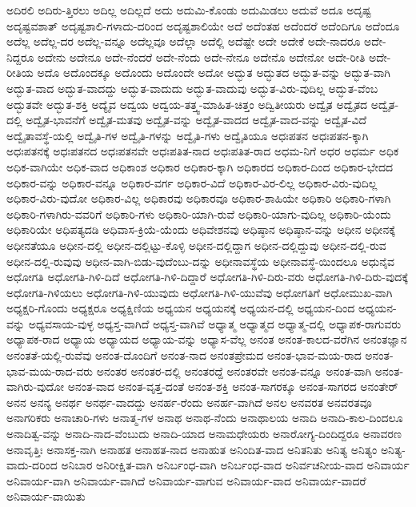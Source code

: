 {ಅದಿರಲಿ
ಅದಿರು-ತ್ತಿರಲು
ಅದಿಲ್ಲ
ಅದಿಲ್ಲದೆ
ಅದು
ಅದುಮಿ-ಕೊಂಡು
ಅದುಮಿಡಲು
ಅದುವೆ
ಅದೂ
ಅದೃಷ್ಟ
ಅದೃಷ್ಟವಶಾತ್
ಅದೃಷ್ಟಶಾಲಿ-ಗಳಾದು-ದರಿಂದ
ಅದೃಷ್ಟಶಾಲಿಯೇ
ಅದೆ
ಅದೆಂತಹ
ಅದೆಂದರೆ
ಅದೆಂದಿಗೂ
ಅದೆಂದೂ
ಅದೆಲ್ಲ
ಅದೆಲ್ಲ-ದರ
ಅದೆಲ್ಲ-ವನ್ನೂ
ಅದೆಲ್ಲವೂ
ಅದೆಲ್ಲಾ
ಅದೆಲ್ಲಿ
ಅದೆಷ್ಟೇ
ಅದೇ
ಅದೇಕೆ
ಅದೇ-ನಾದರೂ
ಅದೇ-ನಿದ್ದರೂ
ಅದೇನು
ಅದೇನೂ
ಅದೇ-ನೆಂದರೆ
ಅದೇ-ನೆಂದು
ಅದೇ-ನೇನೂ
ಅದೇನೊ
ಅದೇನೋ
ಅದೇ-ರೀತಿ
ಅದೇ-ರೀತಿಯ
ಅದೊ
ಅದೊಂದಕ್ಕೂ
ಅದೊಂದು
ಅದೊಂದೇ
ಅದೋ
ಅದ್ಭುತ
ಅದ್ಭುತದ
ಅದ್ಭುತ-ವನ್ನು
ಅದ್ಭುತ-ವಾಗಿ
ಅದ್ಭುತ-ವಾದ
ಅದ್ಭುತ-ವಾದದ್ದು
ಅದ್ಭುತ-ವಾದುದು
ಅದ್ಭುತ-ವಾದುವು
ಅದ್ಭುತ-ವಿರು-ವುದಿಲ್ಲ
ಅದ್ಭುತ-ವೆಂಬ
ಅದ್ಭುತವೇ
ಅದ್ಭುತ-ಶಕ್ತಿ
ಅದ್ಯೈವ
ಅದ್ವಯ
ಅದ್ವಯ-ತತ್ತ್ವ-ಮಾಹಿತ-ಚಿತ್ತಂ
ಅದ್ವಿತೀಯರು
ಅದ್ವೈತ
ಅದ್ವೈತದ
ಅದ್ವೈತ-ದಲ್ಲಿ
ಅದ್ವೈತ-ಭಾವನೆಗೆ
ಅದ್ವೈತ-ಮತವು
ಅದ್ವೈತ-ವನ್ನು
ಅದ್ವೈತ-ವಾದದ
ಅದ್ವೈತ-ವಾದ-ವನ್ನು
ಅದ್ವೈತ-ವಿದೆ
ಅದ್ವೈತಾವಸ್ಥೆ-ಯಲ್ಲಿ
ಅದ್ವೈತಿ-ಗಳ
ಅದ್ವೈತಿ-ಗಳನ್ನು
ಅದ್ವೈತಿ-ಗಳು
ಅದ್ವೈತಿಯೂ
ಅಧಃಪತನ
ಅಧಃಪತನ-ಕ್ಕಾಗಿ
ಅಧಃಪತನಕ್ಕೆ
ಅಧಃಪತನದ
ಅಧಃಪತನವೇ
ಅಧಃಪತಿತ-ನಾದ
ಅಧಃಪತಿತ-ರಾದ
ಅಧಮ-ನಿಗೆ
ಅಧರ
ಅಧರ್ಮ
ಅಧಿಕ
ಅಧಿಕ-ವಾಗಿಯೇ
ಅಧಿಕ-ವಾದ
ಅಧಿಕಾಂಶ
ಅಧಿಕಾರ
ಅಧಿಕಾರ-ಕ್ಕಾಗಿ
ಅಧಿಕಾರದ
ಅಧಿಕಾರ-ದಿಂದ
ಅಧಿಕಾರ-ಭೇದದ
ಅಧಿಕಾರ-ವನ್ನು
ಅಧಿಕಾರ-ವನ್ನೂ
ಅಧಿಕಾರ-ವರ್ಗ
ಅಧಿಕಾರ-ವಿದೆ
ಅಧಿಕಾರ-ವಿರ-ಲಿಲ್ಲ
ಅಧಿಕಾರ-ವಿರು-ವುದಿಲ್ಲ
ಅಧಿಕಾರ-ವಿರು-ವುದೋ
ಅಧಿಕಾರ-ವಿಲ್ಲ
ಅಧಿಕಾರವು
ಅಧಿಕಾರವೂ
ಅಧಿಕಾರ-ಶಾಹಿಯೇ
ಅಧಿಕಾರಿ
ಅಧಿಕಾರಿ-ಗಳಾಗಿ
ಅಧಿಕಾರಿ-ಗಳಾಗಿರು-ವವರಿಗೆ
ಅಧಿಕಾರಿ-ಗಳು
ಅಧಿಕಾರಿ-ಯಾಗಿ-ರುವೆ
ಅಧಿಕಾರಿ-ಯಾಗು-ವುದಿಲ್ಲ
ಅಧಿಕಾರಿ-ಯೆಂದು
ಅಧಿಕಾರಿಯೇ
ಅಧಿಪತ್ಯದಡಿ
ಅಧಿವಾಸ-ಕ್ರಿಯೆ-ಯೆಂದು
ಅಧಿವೇಶನವು
ಅಧಿಷ್ಠಾನ
ಅಧಿಷ್ಠಾನ-ವನ್ನು
ಅಧೀನ
ಅಧೀನಕ್ಕೆ
ಅಧೀನತೆಯೂ
ಅಧೀನ-ದಲ್ಲಿ
ಅಧೀನ-ದಲ್ಲಿಟ್ಟು-ಕೊಳ್ಳಿ
ಅಧೀನ-ದಲ್ಲಿದ್ದಾಗ
ಅಧೀನ-ದಲ್ಲಿದ್ದುವು
ಅಧೀನ-ದಲ್ಲಿ-ರುವ
ಅಧೀನ-ದಲ್ಲಿ-ರುವುವು
ಅಧೀನ-ವಾಗಿ-ಬಿಡು-ವುದೆಂಬು-ದನ್ನು
ಅಧೀನಾವಸ್ಥೆಯ
ಅಧೀನಾವಸ್ಥೆ-ಯಿಂದಲೂ
ಅಧುನೈವ
ಅಧೋಗತಿ
ಅಧೋಗತಿ-ಗಿಳಿ-ದಿದೆ
ಅಧೋಗತಿ-ಗಿಳಿ-ದಿದ್ದಾರೆ
ಅಧೋಗತಿ-ಗಿಳಿ-ದಿರು-ವರು
ಅಧೋಗತಿ-ಗಿಳಿ-ದಿರು-ವುದಕ್ಕೆ
ಅಧೋಗತಿ-ಗಿಳಿಯಲು
ಅಧೋಗತಿ-ಗಿಳಿ-ಯುವುದು
ಅಧೋಗತಿ-ಗಿಳಿ-ಯುವೆವು
ಅಧೋಗತಿಗೆ
ಅಧೋಮುಖ-ವಾಗಿ
ಅಧ್ಯಕ್ಷರಿ-ಗೊಂದು
ಅಧ್ಯಕ್ಷರೂ
ಅಧ್ಯಕ್ಷಿಣಿಯ
ಅಧ್ಯಯನ
ಅಧ್ಯಯನಕ್ಕೆ
ಅಧ್ಯಯನ-ದಲ್ಲಿ
ಅಧ್ಯಯನ-ದಿಂದ
ಅಧ್ಯಯನ-ವನ್ನು
ಅಧ್ಯವಸಾಯ-ವುಳ್ಳ
ಅಧ್ಯಸ್ತ-ವಾಗಿದೆ
ಅಧ್ಯಸ್ತ-ವಾಗಿವೆ
ಅಧ್ಯಾತ್ಮ
ಅಧ್ಯಾತ್ಮದ
ಅಧ್ಯಾತ್ಮ-ದಲ್ಲಿ
ಅಧ್ಯಾಪಕ-ರಾಗುವರು
ಅಧ್ಯಾಪಕ-ರಾದ
ಅಧ್ಯಾಯ
ಅಧ್ಯಾಯದ
ಅಧ್ಯಾಯ-ವನ್ನು
ಅಧ್ಯಾಸ-ವೆಲ್ಲ
ಅನಂತ
ಅನಂತ-ಕಾಲದ-ವರೆಗಿನ
ಅನಂತಜ್ಞಾನ
ಅನಂತತೆ-ಯಲ್ಲಿ-ರುವೆವು
ಅನಂತ-ದೊಂದಿಗೆ
ಅನಂತ-ನಾದ
ಅನಂತಪ್ರೇಮದ
ಅನಂತ-ಭಾವ-ಮಯ-ರಾದ
ಅನಂತ-ಭಾವ-ಮಯ-ರಾದ-ವರು
ಅನಂತರ
ಅನಂತರ-ದಲ್ಲಿ
ಅನಂತರದ್ದೆ
ಅನಂತರವೇ
ಅನಂತ-ವನ್ನೂ
ಅನಂತ-ವಾಗಿ
ಅನಂತ-ವಾಗಿರು-ವುದೋ
ಅನಂತ-ವಾದ
ಅನಂತ-ವೃತ್ತ-ದಂತೆ
ಅನಂತ-ಶಕ್ತಿ
ಅನಂತ-ಸಾಗರಕ್ಕೂ
ಅನಂತ-ಸಾಗರದ
ಅನಂತೇರ್
ಅನನ
ಅನನ್ಯ
ಅನರ್ಥ
ಅನರ್ಥ-ವಾದದ್ದು
ಅನರ್ಹ-ರೆಂದು
ಅನರ್ಹ-ವಾಗಿದೆ
ಅನಲ
ಅನವರತ
ಅನವರತವೂ
ಅನಾಗರಿಕರು
ಅನಾಚಾರಿ-ಗಳು
ಅನಾತ್ಮ-ಗಳ
ಅನಾಥ
ಅನಾಥ-ನೆಂದು
ಅನಾಥಾಲಯ
ಅನಾದಿ
ಅನಾದಿ-ಕಾಲ-ದಿಂದಲೂ
ಅನಾದಿತ್ವ-ವನ್ನು
ಅನಾದಿ-ನಾದ-ವೆಂಬುದು
ಅನಾದಿ-ಯಾದ
ಅನಾಮಧೇಯರು
ಅನಾರೋಗ್ಯ-ದಿಂದಿದ್ದರೂ
ಅನಾವರಣ
ಅನಾವೃತ್ತಿಃ
ಅನಾಸಕ್ತ-ನಾಗಿ
ಅನಾಹತ
ಅನಾಹತ-ನಾದ
ಅನಾಹುತ
ಅನಿಂದಿತ-ವಾದ
ಅನಿತನಿತು
ಅನಿತ್ಯ
ಅನಿತ್ಯಂ
ಅನಿತ್ಯ-ವಾದು-ದರಿಂದ
ಅನಿಬಾರ
ಅನಿರೀಕ್ಷಿತ-ವಾಗಿ
ಅನಿರ್ಬಂಧ-ವಾಗಿ
ಅನಿರ್ಬಂಧ-ವಾದ
ಅನಿರ್ವಚನೀಯ-ವಾದ
ಅನಿವಾರ್ಯ
ಅನಿವಾರ್ಯ-ವಾಗಿ
ಅನಿವಾರ್ಯ-ವಾಗಿದೆ
ಅನಿವಾರ್ಯ-ವಾಗುವ
ಅನಿವಾರ್ಯ-ವಾದ
ಅನಿವಾರ್ಯ-ವಾದರೆ
ಅನಿವಾರ್ಯ-ವಾಯಿತು
}
